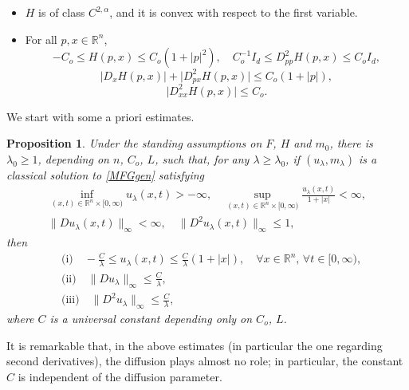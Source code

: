 \documentclass{amsart}
\newtheorem{prop}[thm]{Proposition}
\theoremstyle{remark}
\theoremstyle{definition}
\theoremstyle{Claim}
\newcommand{\R}{\mathbb{R}}
\theoremstyle{plain}
\begin{document}
	\begin{itemize}
		\item[(H1)] $H$ is of class $C^{2,\alpha}$, and it is convex with respect to the first variable.
		\item[(H2)] For all $p,x\in \mathbb{R}^n$, 
		\begin{equation*}
			-C_o\leq H(p,x)\leq C_o(1+\lvert p\rvert^2),\quad C_o^{-1} I_d \leq D^2_{pp}H(p,x)\leq C_o I_d ,
		\end{equation*}
		\begin{equation*}
			\lvert D_x H(p,x)\rvert+\lvert D^2_{px} H(p,x)\rvert\leq C_o(1+\lvert p\rvert) ,
		\end{equation*}
		\begin{equation*}
			\lvert D^2_{xx} H(p,x)\lvert\leq C_o.
		\end{equation*}
	\end{itemize}
	We start with some a priori estimates.
	\begin{prop}\label{estimatesapriori}
	Under the standing assumptions on $F$, $H$ and $m_0$, there is $\lambda_0\geq 1$, depending on $n$, $C_o$, $L$, such that, for any $\lambda \ge \lambda_0$, if $(u_\lambda,m_\lambda)$ is a classical solution to \eqref{MFGgen} satisfying 
	\begin{equation}\label{aprioribounds}
	\begin{gathered}
		\underset{(x,t) \in \R^n \times [0,\infty)}{\inf} u_\lambda(x,t)>-\infty, \quad \sup_{(x,t) \in \R^n \times [0,\infty)}\frac{u_\lambda(x,t)}{1+\lvert x\rvert}<\infty, \\ \lVert Du_\lambda (x,t)\rVert_\infty<\infty,\quad\lVert D^2u_\lambda (x,t)\rVert_\infty\leq1,
       \end{gathered}
	\end{equation}
	then
	\begin{align*}
		& \text{(i)} \quad  -\frac{C}{\lambda}\leq u_\lambda(x,t)\leq \frac{C}{\lambda}(1+\lvert x\rvert), \quad \forall x\in \mathbb{R}^n,\,\forall t\in [0,\infty), \\
		& \text{(ii)} \quad \lVert Du_\lambda\rVert_\infty\leq \frac{C}{\lambda}, \\
		& \text{(iii)} \quad \lVert D^2u_\lambda \lVert_\infty  \leq \frac{C}{\lambda},
	\end{align*}
	where $C$ is a universal constant depending only on $C_o$, $L$.
	\end{prop}
	It is remarkable that, in the above estimates (in particular the one regarding second derivatives), the diffusion plays almost no role; in particular, the constant $C$ is independent of the diffusion parameter.
	
\end{document}
